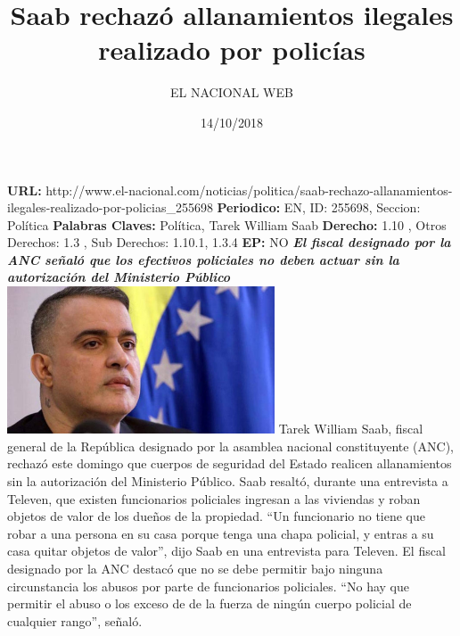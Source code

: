 \documentclass{article}%
\title{\textbf{Saab rechazó allanamientos ilegales realizado por policías}}%
\author{EL NACIONAL WEB}%
\date{14/10/2018}%
\begin{document}
%
\normalsize%
\maketitle%
\textbf{URL: }%
http://www.el{-}nacional.com/noticias/politica/saab{-}rechazo{-}allanamientos{-}ilegales{-}realizado{-}por{-}policias\_255698\newline%
%
\textbf{Periodico: }%
EN, %
ID: %
255698, %
Seccion: %
Política\newline%
%
\textbf{Palabras Claves: }%
Política, Tarek William Saab\newline%
%
\textbf{Derecho: }%
1.10%
, Otros Derechos: %
1.3%
, Sub Derechos: %
1.10.1, 1.3.4%
\newline%
%
\textbf{EP: }%
NO\newline%
\newline%
%
\textbf{\textit{El fiscal designado por la ANC señaló que los efectivos policiales no deben actuar sin la autorización del Ministerio Público}}%
\newline%
\newline%
%
\includegraphics[width=300px]{220.jpg}%
\newline%
%
Tarek William Saab, fiscal general de la República designado por la asamblea nacional constituyente (ANC), rechazó este domingo que cuerpos de seguridad del Estado realicen allanamientos sin la autorización del Ministerio Público.%
\newline%
%
Saab resaltó, durante una entrevista a Televen, que existen funcionarios policiales ingresan a las viviendas y roban objetos de valor de los dueños de la propiedad.%
\newline%
%
“Un funcionario no tiene que robar a una persona en su casa porque tenga una chapa policial, y entras a su casa quitar objetos de valor”, dijo Saab en una entrevista para Televen.%
\newline%
%
El fiscal designado por la ANC destacó que no se debe permitir bajo ninguna circunstancia los abusos por parte de funcionarios policiales.%
\newline%
%
“No hay que permitir el abuso o los exceso de de la fuerza de ningún cuerpo policial de cualquier rango”, señaló.%
\newline%
%
\end{document}
